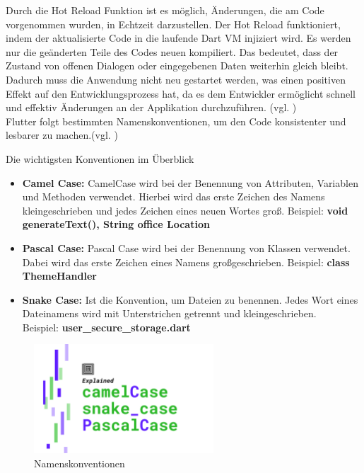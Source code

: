 Durch die Hot Reload Funktion ist es möglich, Änderungen, die am Code vorgenommen wurden, in Echtzeit darzustellen. Der Hot Reload funktioniert, indem der aktualisierte Code in die laufende Dart VM injiziert wird. Es werden nur die geänderten Teile des Codes neuen kompiliert. Das bedeutet, dass der Zustand von offenen Dialogen oder eingegebenen Daten weiterhin gleich bleibt.
Dadurch muss die Anwendung nicht neu gestartet werden, was einen positiven Effekt auf den Entwicklungsprozess hat, da es dem Entwickler ermöglicht schnell und effektiv Änderungen an der Applikation durchzuführen. (vgl. \cite{Hot-Reload})\\

Flutter folgt bestimmten Namenskonventionen, um den Code konsistenter und lesbarer zu machen.(vgl. \cite{name-conventions-desc})

Die wichtigsten Konventionen im Überblick

\begin{itemize}
    \item {\textbf{Camel Case:}} CamelCase wird bei der Benennung von Attributen, Variablen und Methoden verwendet. Hierbei wird das erste Zeichen des Namens kleingeschrieben und jedes Zeichen eines neuen Wortes gro\ss. Beispiel: {\textbf{void generateText(), String office Location}} 
    
    \item {\textbf{Pascal Case:}} Pascal Case wird bei der Benennung von Klassen verwendet. Dabei wird das erste Zeichen eines Namens gro\ss geschrieben. Beispiel: {\textbf{class ThemeHandler}}
    
    \item {\textbf{Snake Case:}} Ist die Konvention, um Dateien zu benennen. Jedes Wort eines Dateinamens wird mit Unterstrichen getrennt und kleingeschrieben.\\ Beispiel: {\textbf{user\_secure\_storage.dart}} 
\end{itemize}

\begin{figure}[h!]
\centering
\includegraphics[width=0.6\textwidth]{FLUTTER/images/GP/conventions.png}
\caption{Namenskonventionen\cite{name-conventions}}
\end{figure}

